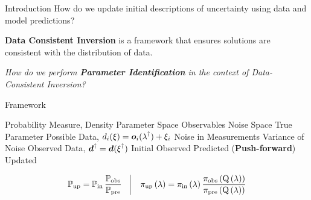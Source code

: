 \begin{block}{Introduction}
\centering
            {\large How do we update initial descriptions of uncertainty using data and model predictions?}

             {\large \textbf{Data Consistent Inversion} is a framework that ensures solutions are consistent with the distribution of data.}

             {\large \emph{How do we perform \textbf{Parameter Identification} in the context of Data-Consistent Inversion?} }

\end{block}

\begin{block}{Framework}
\large
    \begin{itemize}
        \itembox{$ \PP, \; \pi $} Probability Measure, Density
         Parameter Space
         Observables
         Noise Space
        \itembox{$\param^\dagger\in\pspace$} True Parameter
         Possible Data, $d_i(\operatorname*{\xi}) = \boldsymbol{o}_i(\operatorname*{\lambda}^\dagger) + \xi_i$
        \itembox{$\noise^\dagger\in\nspace$} Noise in Measurements
         Variance of Noise
         Observed Data, $\boldsymbol{d}^\dagger = \boldsymbol{d}(\operatorname*{\xi}^\dagger)$
        \itembox{$ \initialP, \; \initial $} Initial
        \itembox{$ \observedP, \; \observed $} Observed
        \itembox{$ \predictedP, \; \predicted $} Predicted (\textbf{Push-forward})
        \itembox{$ \updatedP, \; \updated $} Updated
    \end{itemize}
\centering
    \begin{equation*}
            \dciP \quad \vline \quad \dci
    \end{equation*}

\end{block}

